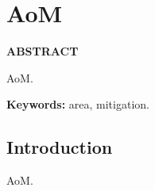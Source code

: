 \chapter{AoM}\label{cap:aom}

\begin{refsection}

\textbf{ABSTRACT}

AoM.

\textbf{Keywords:} area, mitigation.

\section{Introduction}

AoM.

\printbibliography[heading=subbibliography]
\end{refsection}
